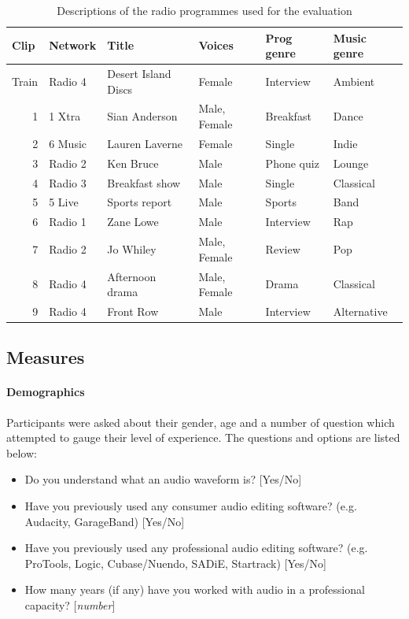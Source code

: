 \begin{table}[htbp]
  \begin{center}
    \begin{tabular}{|r|l|l|l|l|l|}
      \hline
      \multicolumn{1}{|l|}{\textbf{Clip}} & \textbf{Network} & \textbf{Title} &
      \textbf{Voices} & \textbf{Prog genre} & \textbf{Music genre} \\ \hline
      Train & Radio 4 & Desert Island Discs & Female & Interview & Ambient \\ \hline
      1 & 1 Xtra & Sian Anderson & Male, Female & Breakfast & Dance \\ \hline
      2 & 6 Music & Lauren Laverne & Female & Single & Indie \\ \hline
      3 & Radio 2 & Ken Bruce & Male & Phone quiz & Lounge \\ \hline
      4 & Radio 3 & Breakfast show & Male & Single & Classical \\ \hline
      5 & 5 Live & Sports report & Male & Sports & Band \\ \hline
      6 & Radio 1 & Zane Lowe & Male & Interview & Rap \\ \hline
      7 & Radio 2 & Jo Whiley & Male, Female & Review & Pop \\ \hline
      8 & Radio 4 & Afternoon drama & Male, Female & Drama & Classical \\ \hline
      9 & Radio 4 & Front Row & Male & Interview & Alternative \\ \hline
    \end{tabular}
  \end{center}
  \caption{Descriptions of the radio programmes used for the evaluation}
  \label{tab:clips}
\end{table}

\subsection{Measures}\label{sec:measures}
\paragraph{Demographics}
Participants were asked about their gender, age and a number of question which
attempted to gauge their level of experience. The questions and options are
listed below:

{\singlespacing
\begin{itemize}
  \item Do you understand what an audio waveform is? [Yes/No]
  \item Have you previously used any consumer audio editing software? (e.g.
    Audacity, GarageBand) [Yes/No]
  \item Have you previously used any professional audio editing software? (e.g.
    ProTools, Logic, Cubase/Nuendo, SADiE, Startrack) [Yes/No]
  \item How many years (if any) have you worked with audio in a professional
    capacity? [\textit{number}]
\end{itemize}
}

